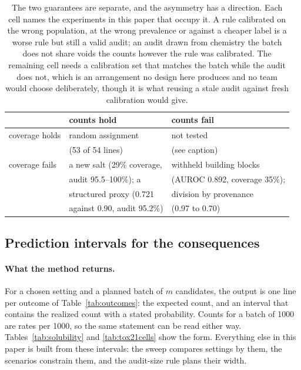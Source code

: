 \documentclass[twocolumn,10pt]{article}
\begin{document}
\begin{table}[t]
\centering
\caption{The two guarantees are separate, and the asymmetry has a direction. Each cell names
the experiments in this paper that occupy it. A rule calibrated on the wrong population, at the
wrong prevalence or against a cheaper label is a worse rule but still a valid audit; an audit
drawn from chemistry the batch does not share voids the counts however the rule was calibrated.
The remaining cell needs a calibration set that matches the batch while the audit does not,
which is an arrangement no design here produces and no team would choose deliberately, though
it is what reusing a stale audit against fresh calibration would give.}
\label{tab:decoupling}
\footnotesize
\setlength{\tabcolsep}{4pt}
\begin{tabular}{lll}
\toprule
 & counts hold & counts fail \\
\midrule
coverage holds & random assignment & not tested \\
               & (53 of 54 lines) & (see caption) \\[2pt]
coverage fails & a new salt (29\% coverage, & withheld building blocks \\
               & audit 95.5--100\%); a & (AUROC 0.892, coverage 35\%); \\
               & structured proxy (0.721 & division by provenance \\
               & against 0.90, audit 95.2\%) & ($0.97$ to $0.70$) \\
\bottomrule
\end{tabular}
\end{table}

\subsection{Prediction intervals for the consequences}
\label{sec:methods:intervals}

\paragraph{What the method returns.} For a chosen setting and a planned batch of $m$ candidates, the output is one line per outcome of Table~\ref{tab:outcomes}: the expected count, and an interval that contains the realized count with a stated probability. Counts for a batch of 1000 are rates per 1000, so the same statement can be read either way. Tables~\ref{tab:solubility} and \ref{tab:tox21cells} show the form. Everything else in this paper is built from these intervals: the sweep compares settings by them, the scenarios constrain them, and the audit-size rule plans their width.
\end{document}
